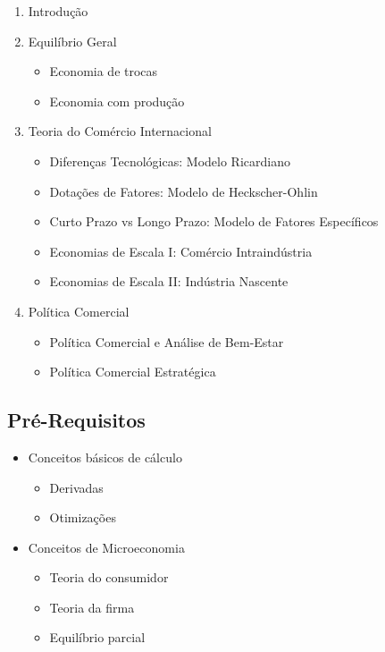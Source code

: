 \documentclass[a4paper,12pt]{article}[abntex2]
\begin{document}
\begin{enumerate}
    \item Introdução
    \item Equilíbrio Geral\begin{itemize}
        \item Economia de trocas
        \item Economia com produção
    \end{itemize}
    \item Teoria do Comércio Internacional\begin{itemize}
        \item Diferenças Tecnológicas: Modelo Ricardiano
        \item Dotações de Fatores: Modelo de Heckscher-Ohlin
        \item Curto Prazo vs Longo Prazo: Modelo de Fatores Específicos
        \item Economias de Escala I: Comércio Intraindústria
        \item Economias de Escala II: Indústria Nascente
    \end{itemize}
    \item Política Comercial\begin{itemize}
        \item Política Comercial e Análise de Bem-Estar
        \item Política Comercial Estratégica
    \end{itemize}
\end{enumerate}

\subsection*{\textbf{Pré-Requisitos}}
\begin{itemize}
    \item Conceitos básicos de cálculo\begin{itemize}
        \item Derivadas
        \item Otimizações
    \end{itemize}
    \item Conceitos de Microeconomia\begin{itemize}
        \item Teoria do consumidor
        \item Teoria da firma
        \item Equilíbrio parcial
    \end{itemize}
\end{itemize}
\end{document}
